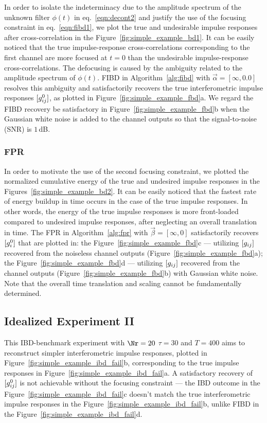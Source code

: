 In order to isolate the indeterminacy due to the 
amplitude spectrum of the unknown filter $\phi(t)$ in eq.~\ref{eqn:decont2}
and 
justify the use of the 
focusing constraint in eq.~\ref{eqn:fibd1},
we plot 
the true and undesirable impulse responses after cross-correlation
in the Figure~\ref{fig:simple_example_bd1}.
%
It can be easily noticed
that the true impulse-response cross-correlations corresponding to the first channel
are more focused at $t=0$ 
than the 
undesirable impulse-response cross-correlations.
%
The defocusing is caused by the ambiguity 
related to the amplitude spectrum of $\phi(t)$.
%
FIBD in Algorithm~\ref{alg:fibd} with $\vec{\alpha}=[\infty,0.0]$ 
resolves this ambiguity 
and
satisfactorily recovers the true
interferometric impulse responses $[g^0_{ij}]$, as plotted in Figure~\ref{fig:simple_example_fbd}a.
%
We regard the FIBD recovery be satisfactory in Figure~\ref{fig:simple_example_fbd}b
when the 
Gaussian white noise is added to the channel outputs so that the signal-to-noise (SNR) is $1\,$dB.

\subsubsection*{FPR}


In order to motivate the use of the second focusing constraint,
we plotted the 
normalized 
cumulative energy 
of the 
true and undesired impulse responses
in the Figures~\ref{fig:simple_example_bd2}.
%
It can be easily noticed that the fastest 
rate of energy buildup in time occurs in the 
case of the true impulse responses.
%
In other words, the energy of the 
true impulse responses is more front-loaded compared to 
undesired impulse responses, after neglecting an overall translation in time.
%
The FPR in Algorithm~\ref{alg:fpr} with $\vec{\beta}=[\infty, 0]$ 
satisfactorily recovers $[g^0_{i}]$ that are plotted in: the 
Figure~\ref{fig:simple_example_fbd}c --- utilizing $[g_{ij}]$ recovered from the noiseless channel outputs (Figure~\ref{fig:simple_example_fbd}a);
the Figure~\ref{fig:simple_example_fbd}d --- utilizing $[g_{ij}]$ 
recovered from the channel outputs (Figure~\ref{fig:simple_example_fbd}b) with Gaussian white noise.
Note that the overall time translation and scaling cannot be fundamentally determined.
%

\subsection{Idealized Experiment II}
This IBD-benchmark 
experiment with $\Nr=20$ $\tau=30$ and $T=400$
aims to reconstruct simpler  
interferometric impulse responses, plotted in 
Figure~\ref{fig:simple_example_ibd_fail}b, corresponding to the 
true impulse responses in Figure~\ref{fig:simple_example_ibd_fail}a.
%
A satisfactory recovery of $[g^0_{ij}]$ is not achievable without the focusing constraint ---
the IBD outcome in the Figure~\ref{fig:simple_example_ibd_fail}c
doesn't match the true 
interferometric impulse responses in the Figure~\ref{fig:simple_example_ibd_fail}b, unlike FIBD in the Figure~\ref{fig:simple_example_ibd_fail}d.

